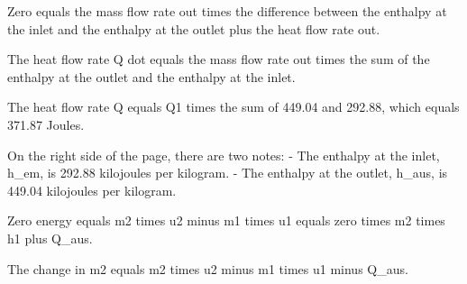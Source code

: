 Zero equals the mass flow rate out times the difference between the enthalpy at the inlet and the enthalpy at the outlet plus the heat flow rate out.

The heat flow rate Q dot equals the mass flow rate out times the sum of the enthalpy at the outlet and the enthalpy at the inlet.

The heat flow rate Q equals Q1 times the sum of 449.04 and 292.88, which equals 371.87 Joules.

On the right side of the page, there are two notes:
- The enthalpy at the inlet, h_em, is 292.88 kilojoules per kilogram.
- The enthalpy at the outlet, h_aus, is 449.04 kilojoules per kilogram.

Zero energy equals m2 times u2 minus m1 times u1 equals zero times m2 times h1 plus Q_aus.

The change in m2 equals m2 times u2 minus m1 times u1 minus Q_aus.